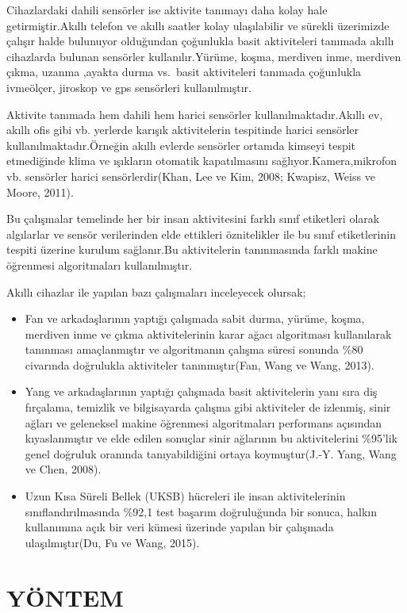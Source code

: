 \documentclass[12pt,twoside]{deuthesis}
\begin{document}
Cihazlardaki dahili sensörler ise aktivite tanımayı daha kolay hale getirmiştir.Akıllı telefon ve akıllı saatler kolay ulaşılabilir ve sürekli üzerimizde çalışır halde bulunuyor olduğundan çoğunlukla basit aktiviteleri tanımada akıllı cihazlarda bulunan sensörler kullanılır.Yürüme, koşma, merdiven inme, merdiven çıkma, uzanma ,ayakta durma vs.~basit aktiviteleri tanımada çoğunlukla ivmeölçer, jiroskop ve gps sensörleri kullanılmıştır.

Aktivite tanımada hem dahili hem harici sensörler kullanılmaktadır.Akıllı ev, akıllı ofis gibi vb. yerlerde karışık aktivitelerin tespitinde harici sensörler kullanılmaktadır.Örneğin akıllı evlerde sensörler ortamda kimseyi tespit etmediğinde klima ve ışıkların otomatik kapatılmasını sağlıyor.Kamera,mikrofon vb. sensörler harici sensörlerdir(Khan, Lee ve Kim, 2008; Kwapisz, Weiss ve Moore, 2011).

Bu çalışmalar temelinde her bir insan aktivitesini farklı sınıf etiketleri olarak algılarlar ve sensör verilerinden elde ettikleri öznitelikler ile bu sınıf etiketlerinin tespiti üzerine kurulum sağlanır.Bu aktivitelerin tanınmasında farklı makine öğrenmesi algoritmaları kullanılmıştır.

Akıllı cihazlar ile yapılan bazı çalışmaları inceleyecek olursak;
\begin{itemize}
\item
  Fan ve arkadaşlarının yaptığı çalışmada sabit durma, yürüme, koşma, merdiven inme ve çıkma aktivitelerinin karar ağacı algoritması kullanılarak tanınması amaçlanmıştır ve algoritmanın çalışma süresi sonunda \%80 civarında doğrulukla aktiviteler tanınmıştır(Fan, Wang ve Wang, 2013).
\item
  Yang ve arkadaşlarının yaptığı çalışmada basit aktivitelerin yanı sıra diş fırçalama, temizlik ve bilgisayarda çalışma gibi aktiviteler de izlenmiş, sinir ağları ve geleneksel makine öğrenmesi algoritmaları performans açısından kıyaslanmıştır ve elde edilen sonuçlar sinir ağlarının bu aktivitelerini \%95'lik genel doğruluk oranında tanıyabildiğini ortaya koymuştur(J.-Y. Yang, Wang ve Chen, 2008).
\item
  Uzun Kısa Süreli Bellek (UKSB) hücreleri ile insan aktivitelerinin sınıflandırılmasında \%92,1 test başarım doğruluğunda bir sonuca, halkın kullanımına açık bir veri kümesi üzerinde yapılan bir çalışmada ulaşılmıştır(Du, Fu ve Wang, 2015).
\end{itemize}
\hypertarget{math-sci}{%
\chapter{YÖNTEM}\label{math-sci}}
\end{document}
